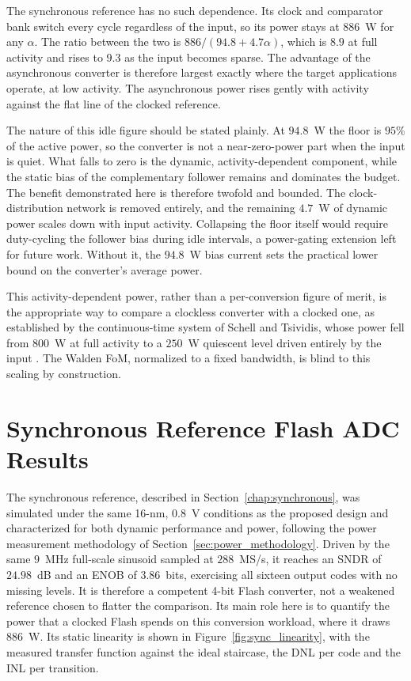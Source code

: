 The synchronous reference has no such dependence. Its clock and comparator bank switch every cycle regardless of the input, so its power stays at $886$~\textmu W for any $\alpha$. The ratio between the two is $886/(94.8 + 4.7\alpha)$, which is $8.9$ at full activity and rises to $9.3$ as the input becomes sparse. The advantage of the asynchronous converter is therefore largest exactly where the target applications operate, at low activity. The asynchronous power rises gently with activity against the flat line of the clocked reference.

The nature of this idle figure should be stated plainly. At $94.8$~\textmu W the floor is $95\%$ of the active power, so the converter is not a near-zero-power part when the input is quiet. What falls to zero is the dynamic, activity-dependent component, while the static bias of the complementary follower remains and dominates the budget. The benefit demonstrated here is therefore twofold and bounded. The clock-distribution network is removed entirely, and the remaining $4.7$~\textmu W of dynamic power scales down with input activity. Collapsing the floor itself would require duty-cycling the follower bias during idle intervals, a power-gating extension left for future work. Without it, the $94.8$~\textmu W bias current sets the practical lower bound on the converter's average power.

This activity-dependent power, rather than a per-conversion figure of merit, is the appropriate way to compare a clockless converter with a clocked one, as established by the continuous-time system of Schell and Tsividis, whose power fell from $800$~\textmu W at full activity to a $250$~\textmu W quiescent level driven entirely by the input \cite{schell2008}. The Walden FoM, normalized to a fixed bandwidth, is blind to this scaling by construction.

\section{Synchronous Reference Flash ADC Results}
\label{sec:sync_results}

The synchronous reference, described in Section~\ref{chap:synchronous}, was simulated under the same 16-nm, $0.8$~V conditions as the proposed design and characterized for both dynamic performance and power, following the power measurement methodology of Section~\ref{sec:power_methodology}. Driven by the same $9$~MHz full-scale sinusoid sampled at $288$~MS/s, it reaches an SNDR of $24.98$~dB and an ENOB of $3.86$~bits, exercising all sixteen output codes with no missing levels. It is therefore a competent 4-bit Flash converter, not a weakened reference chosen to flatter the comparison. Its main role here is to quantify the power that a clocked Flash spends on this conversion workload, where it draws $886$~\textmu W. Its static linearity is shown in Figure~\ref{fig:sync_linearity}, with the measured transfer function against the ideal staircase, the DNL per code and the INL per transition.

